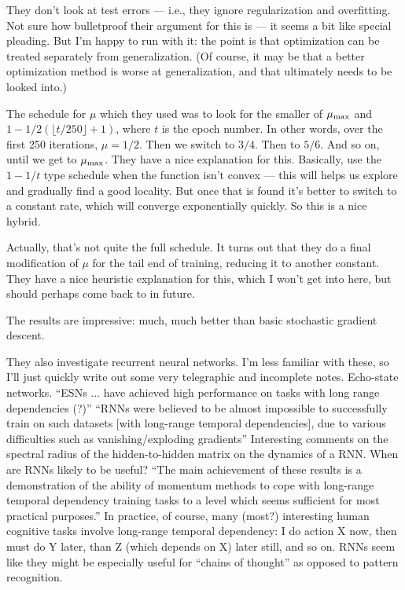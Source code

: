 \documentclass[12pt]{report}
\begin{document}
They don't look at test errors --- i.e., they ignore regularization
and overfitting.  Not sure how bulletproof their argument for this is
--- it seems a bit like special pleading.  But I'm happy to run with
it: the point is that optimization can be treated separately from
generalization.  (Of course, it may be that a better optimization
method is worse at generalization, and that ultimately needs to be
looked into.)

The schedule for $\mu$ which they used was to look for the smaller of
$\mu_{\rm max}$ and $1-1/2(\lfloor t/250 \rfloor +1)$, where $t$ is
the epoch number.  In other words, over the first 250 iterations, $\mu
= 1/2$.  Then we switch to $3/4$.  Then to $5/6$.  And so on, until we
get to $\mu_{\rm max}$.  They have a nice explanation for this.
Basically, use the $1-1/t$ type schedule when the function isn't
convex --- this will helps us explore and gradually find a good
locality.  But once that is found it's better to switch to a constant
rate, which will converge exponentially quickly.  So this is a nice
hybrid.  

Actually, that's not quite the full schedule.  It turns out that they
do a final modification of $\mu$ for the tail end of training,
reducing it to another constant.  They have a nice heuristic
explanation for this, which I won't get into here, but should perhaps
come back to in future.

The results are impressive: much, much better than basic stochastic
gradient descent.

They also investigate recurrent neural networks.  I'm less familiar
with these, so I'll just quickly write out some very telegraphic and
incomplete notes.  Echo-state networks.  ``ESNs ... have achieved high
performance on tasks with long range dependencies (?)''  ``RNNs were
believed to be almost impossible to successfully train on such
datasets [with long-range temporal dependencies], due to various
difficulties such as vanishing/exploding gradients'' Interesting
comments on the spectral radius of the hidden-to-hidden matrix on the
dynamics of a RNN.  When are RNNs likely to be useful?  ``The main
achievement of these results is a demonstration of the ability of
momentum methods to cope with long-range temporal dependency training
tasks to a level which seems sufficient for most practical purposes.''
In practice, of course, many (most?) interesting human cognitive tasks
involve long-range temporal dependency: I do action X now, then must
do Y later, than Z (which depends on X) later still, and so on.  RNNs
seem like they might be especially useful for ``chains of thought'' as
opposed to pattern recognition.
\end{document}
